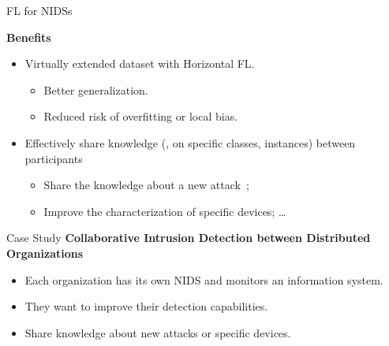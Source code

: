 \begin{frame}{FL for NIDSs}

  \textbf{Benefits}
  \begin{itemize}[<+->]
    \item Virtually extended dataset with Horizontal FL.
    \begin{itemize}[<1->]
      \item Better generalization.
      \item Reduced risk of overfitting or local bias.
    \end{itemize}
    

    \item Effectively share knowledge (\eg, on specific classes, instances) between participants
    \begin{itemize}[<1->]
      \item Share the knowledge about a new attack~\autocite{lavaur_icdcs_demo_2024};
      \item Improve the characterization of specific devices; \dots
    \end{itemize}


  \end{itemize}
\end{frame}

\begin{frame}{Case Study}
  \textbf{Collaborative Intrusion Detection between Distributed Organizations}
  \begin{itemize}
    \item Each organization has its own NIDS and monitors an information system.
    \item They want to improve their detection capabilities.
    \item Share knowledge about new attacks or specific devices.
  \end{itemize}

\end{frame}

